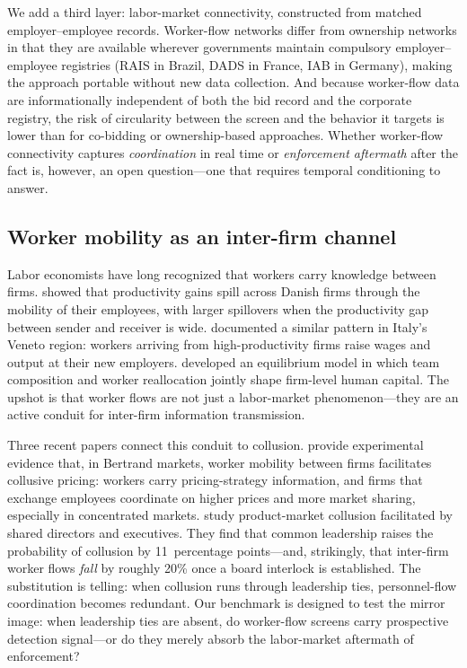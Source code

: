 We add a third layer: labor-market connectivity, constructed from matched employer--employee records. Worker-flow networks differ from ownership networks in that they are available wherever governments maintain compulsory employer--employee registries (RAIS in Brazil, DADS in France, IAB in Germany), making the approach portable without new data collection. And because worker-flow data are informationally independent of both the bid record and the corporate registry, the risk of circularity between the screen and the behavior it targets is lower than for co-bidding or ownership-based approaches. Whether worker-flow connectivity captures \emph{coordination} in real time or \emph{enforcement aftermath} after the fact is, however, an open question---one that requires temporal conditioning to answer.

\subsection{Worker mobility as an inter-firm channel}

Labor economists have long recognized that workers carry knowledge between firms. \citet{stoyanov2012worker} showed that productivity gains spill across Danish firms through the mobility of their employees, with larger spillovers when the productivity gap between sender and receiver is wide. \citet{serafinelli2019good} documented a similar pattern in Italy's Veneto region: workers arriving from high-productivity firms raise wages and output at their new employers. \citet{jarosch2021learning} developed an equilibrium model in which team composition and worker reallocation jointly shape firm-level human capital. The upshot is that worker flows are not just a labor-market phenomenon---they are an active conduit for inter-firm information transmission.

Three recent papers connect this conduit to collusion. \citet{lamichhane2024collusion} provide experimental evidence that, in Bertrand markets, worker mobility between firms facilitates collusive pricing: workers carry pricing-strategy information, and firms that exchange employees coordinate on higher prices and more market sharing, especially in concentrated markets. \citet{herrera2025collusion} study product-market collusion facilitated by shared directors and executives. They find that common leadership raises the probability of collusion by 11~percentage points---and, strikingly, that inter-firm worker flows \emph{fall} by roughly 20\% once a board interlock is established. The substitution is telling: when collusion runs through leadership ties, personnel-flow coordination becomes redundant. Our benchmark is designed to test the mirror image: when leadership ties are absent, do worker-flow screens carry prospective detection signal---or do they merely absorb the labor-market aftermath of enforcement?

